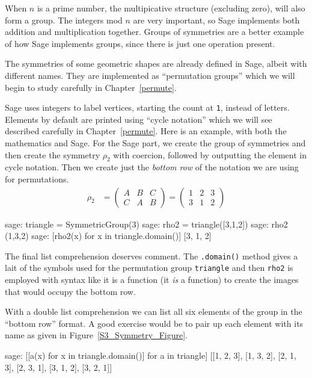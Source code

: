 %
When $n$ is a prime number, the multipicative structure (excluding zero), will also form a group.
%
The integers mod $n$ are very important, so Sage implements both addition and multiplication together.  Groups of symmetries are a better example of how Sage implements groups, since there is just one operation present.\par
%
%
The symmetries of some geometric shapes are already defined in Sage, albeit with different names.  They are implemented as ``permutation groups'' which we will begin to study carefully in Chapter~\ref{permute}.\par
%
Sage uses integers to label vertices, starting the count at \verb?1?, instead of letters.  Elements by default are printed using ``cycle notation'' which we will see described carefully in Chapter~\ref{permute}.    Here is an example, with both the mathematics and Sage.  For the Sage part, we create the group of symmetries and then create the symmetry $\rho_2$ with coercion, followed by outputting the element in cycle notation.  Then we create just the \emph{bottom row} of the notation we are using for permutations.
%
\begin{align*}
\rho_2&=
\begin{pmatrix}
A & B & C\\
C & A & B
\end{pmatrix}
=
\begin{pmatrix}
1 & 2 & 3\\
3 & 1 & 2
\end{pmatrix}
\end{align*}
%
\begin{sageexample}
sage: triangle = SymmetricGroup(3)
sage: rho2 = triangle([3,1,2])
sage: rho2
(1,3,2)
sage: [rho2(x) for x in triangle.domain()]
[3, 1, 2]
\end{sageexample}
%
The final list comprehension deserves comment.  The \verb?.domain()? method gives a lait of the symbols used for the permutation group \verb?triangle? and then \verb?rho2? is employed with syntax like it is a function (it \emph{is} a function) to create the images that would occupy the bottom row.\par
%
With a double list comprehension we can list all six elements of the group in the ``bottom row'' format.  A good exercise would be to pair up each element with its name as given in Figure~\ref{S3_Symmetry_Figure}.
%
\begin{sageexample}
sage: [[a(x) for x in triangle.domain()] for a in triangle]
[[1, 2, 3], [1, 3, 2], [2, 1, 3], [2, 3, 1], [3, 1, 2], [3, 2, 1]]
\end{sageexample}
